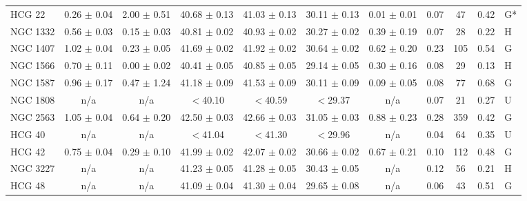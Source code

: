 \begin{table*}
\begin{center}
\begin{tabular}{@{}lcccccccccl@{}}
HCG 22               &  0.26 $\pm$ 0.04  &  2.00 $\pm$ 0.51  &  40.68 $\pm$ 0.13  &  41.03  $\pm$ 0.13  &  30.11 $\pm$ 0.13  &  0.01 $\pm$ 0.01  &  0.07         &  47                 &  0.42                &  G*     \\
NGC 1332             &  0.56 $\pm$ 0.03  &  0.15 $\pm$ 0.03  &  40.81 $\pm$ 0.02  &  40.93  $\pm$ 0.02  &  30.27 $\pm$ 0.02  &  0.39 $\pm$ 0.19  &  0.07         &  28                 &  0.22                &  H      \\
NGC 1407             &  1.02 $\pm$ 0.04  &  0.23 $\pm$ 0.05  &  41.69 $\pm$ 0.02  &  41.92  $\pm$ 0.02  &  30.64 $\pm$ 0.02  &  0.62 $\pm$ 0.20  &  0.23         &  105                &  0.54                &  G      \\
NGC 1566             &  0.70 $\pm$ 0.11  &  0.00 $\pm$ 0.02  &  40.41 $\pm$ 0.05  &  40.85  $\pm$ 0.05  &  29.14 $\pm$ 0.05  &  0.30 $\pm$ 0.16  &  0.08         &  29                 &  0.13                &  H      \\
NGC 1587             &  0.96 $\pm$ 0.17  &  0.47 $\pm$ 1.24  &  41.18 $\pm$ 0.09  &  41.53  $\pm$ 0.09  &  30.11 $\pm$ 0.09  &  0.09 $\pm$ 0.05  &  0.08         &  77                 &  0.68                &  G      \\
NGC 1808             &  n/a              &  n/a              &  $<$40.10          &  $<$40.59           &  $<$29.37          &  n/a              &  0.07         &  21                 &  0.27                &  U      \\
NGC 2563             &  1.05 $\pm$ 0.04  &  0.64 $\pm$ 0.20  &  42.50 $\pm$ 0.03  &  42.66  $\pm$ 0.03  &  31.05 $\pm$ 0.03  &  0.88 $\pm$ 0.23  &  0.28         &  359                &  0.42                &  G      \\
HCG 40               &  n/a              &  n/a              &  $<$41.04          &  $<$41.30           &  $<$29.96          &  n/a              &  0.04         &  64                 &  0.35                &  U      \\
HCG 42               &  0.75 $\pm$ 0.04  &  0.29 $\pm$ 0.10  &  41.99 $\pm$ 0.02  &  42.07  $\pm$ 0.02  &  30.66 $\pm$ 0.02  &  0.67 $\pm$ 0.21  &  0.10         &  112                &  0.48                &  G      \\
NGC 3227             &  n/a              &  n/a              &  41.23 $\pm$ 0.05  &  41.28  $\pm$ 0.05  &  30.43 $\pm$ 0.05  &  n/a              &  0.12         &  56                 &  0.21                &  H      \\
HCG 48               &  n/a              &  n/a              &  41.09 $\pm$ 0.04  &  41.30  $\pm$ 0.04  &  29.65 $\pm$ 0.08  &  n/a              &  0.06         &  43                 &  0.51                &  G      \\

\end{tabular}
\end{center}
\end{table*}
